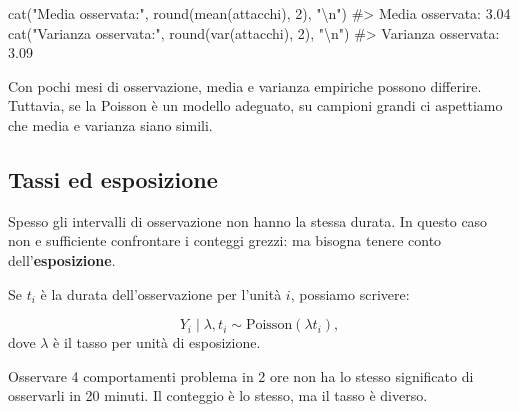 \documentclass[
  italian,
  letterpaper,
  a4paper,
  11pt,
  open=any]{scrbook}
\newenvironment{Shaded}{\begin{snugshade}}{\end{snugshade}}
\newcommand{\CommentTok}[1]{\textcolor[rgb]{0.37,0.37,0.37}{#1}}
\newcommand{\DecValTok}[1]{\textcolor[rgb]{0.68,0.00,0.00}{#1}}
\newcommand{\FunctionTok}[1]{\textcolor[rgb]{0.28,0.35,0.67}{#1}}
\newcommand{\NormalTok}[1]{\textcolor[rgb]{0.00,0.23,0.31}{#1}}
\newcommand{\SpecialCharTok}[1]{\textcolor[rgb]{0.37,0.37,0.37}{#1}}
\newcommand{\StringTok}[1]{\textcolor[rgb]{0.13,0.47,0.30}{#1}}
\theoremstyle{plain}
\theoremstyle{definition}
\theoremstyle{definition}
\theoremstyle{remark}
\begin{document}
\begin{Shaded}
\begin{Highlighting}[]
\FunctionTok{cat}\NormalTok{(}\StringTok{"Media osservata:"}\NormalTok{, }\FunctionTok{round}\NormalTok{(}\FunctionTok{mean}\NormalTok{(attacchi), }\DecValTok{2}\NormalTok{), }\StringTok{"}\SpecialCharTok{\textbackslash{}n}\StringTok{"}\NormalTok{)}
\CommentTok{\#\textgreater{} Media osservata: 3.04}
\FunctionTok{cat}\NormalTok{(}\StringTok{"Varianza osservata:"}\NormalTok{, }\FunctionTok{round}\NormalTok{(}\FunctionTok{var}\NormalTok{(attacchi), }\DecValTok{2}\NormalTok{), }\StringTok{"}\SpecialCharTok{\textbackslash{}n}\StringTok{"}\NormalTok{)}
\CommentTok{\#\textgreater{} Varianza osservata: 3.09}
\end{Highlighting}
\end{Shaded}

Con pochi mesi di osservazione, media e varianza empiriche possono
differire. Tuttavia, se la Poisson è un modello adeguato, su campioni
grandi ci aspettiamo che media e varianza siano simili.

\subsection{Tassi ed esposizione}\label{tassi-ed-esposizione}

Spesso gli intervalli di osservazione non hanno la stessa durata. In
questo caso non e sufficiente confrontare i conteggi grezzi: ma bisogna
tenere conto dell'\textbf{esposizione}.

Se \(t_i\) è la durata dell'osservazione per l'unità \(i\), possiamo
scrivere:

\[
Y_i \mid \lambda,t_i \sim \mathrm{Poisson}(\lambda t_i),
\] dove \(\lambda\) è il tasso per unità di esposizione.

\begin{tcolorbox}[enhanced jigsaw, arc=.35mm, bottomrule=.15mm, bottomtitle=1mm, breakable, colback=white, colbacktitle=quarto-callout-note-color!10!white, colframe=quarto-callout-note-color-frame, coltitle=black, left=2mm, leftrule=.75mm, opacityback=0, opacitybacktitle=0.6, rightrule=.15mm, title=\textcolor{quarto-callout-note-color}{\faInfo}\hspace{0.5em}{Esempio}, titlerule=0mm, toprule=.15mm, toptitle=1mm]

Osservare 4 comportamenti problema in 2 ore non ha lo stesso significato
di osservarli in 20 minuti. Il conteggio è lo stesso, ma il tasso è
diverso.

\end{tcolorbox}
\end{document}

